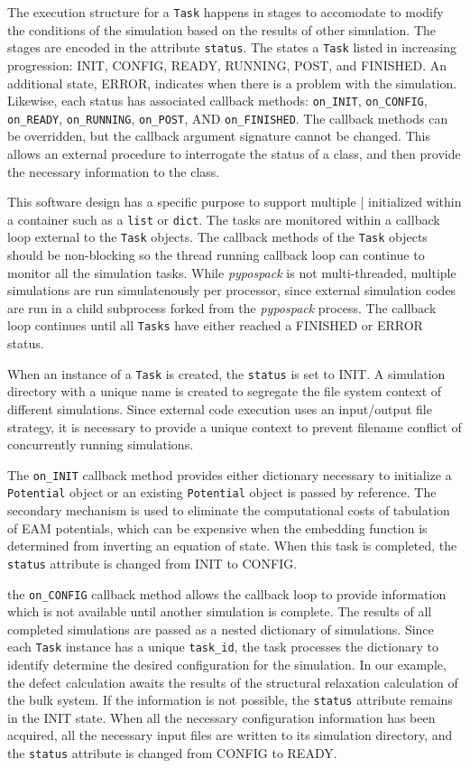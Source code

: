 The execution structure for a \verb|Task| happens in stages to accomodate to modify the conditions of the simulation based on the results of other simulation.  The stages are encoded in the attribute \verb|status|.  The states a \verb|Task| listed in increasing progression: INIT, CONFIG, READY, RUNNING, POST, and FINISHED.  An additional state, ERROR, indicates when there is a problem with the simulation.  Likewise, each status has associated callback methods: \verb|on_INIT|, \verb|on_CONFIG|, \verb|on_READY|, \verb|on_RUNNING|, \verb|on_POST|, AND \verb|on_FINISHED|.  The callback methods can be overridden, but the callback argument signature cannot be changed.  This allows an external procedure to interrogate the status of a class, and then provide the necessary information to the class.

This software design has a specific purpose to support multiple \Tasks| initialized within a container such as a \verb|list| or \verb|dict|.  The tasks are monitored within a callback loop external to the \verb|Task| objects.  The callback methods of the \verb|Task| objects should be non-blocking so the thread running callback loop can continue to monitor all the simulation tasks.  While \emph{pypospack} is not multi-threaded, multiple simulations are run simulatenously per processor, since external simulation codes are run in a child subprocess forked from the \emph{pypospack} process.  The callback loop continues until all \verb|Tasks| have either reached a FINISHED or ERROR status.

When an instance of a \verb|Task| is created, the \verb|status| is set to INIT.  A simulation directory with a unique name is created to segregate the file system context of different simulations.  Since external code execution uses an input/output file strategy, it is necessary to provide a unique context to prevent filename conflict of concurrently running simulations.

The \verb|on_INIT| callback method provides either dictionary necessary to initialize a \verb|Potential| object or an existing \verb|Potential| object is passed by reference.  The secondary mechanism is used to eliminate the computational costs of tabulation of EAM potentials, which can be expensive when the embedding function is determined from inverting an equation of state.  When this task is completed, the \verb|status| attribute is changed from INIT to CONFIG.

the \verb|on_CONFIG| callback method allows the callback loop to provide information which is not available until another simulation is complete.  The results of all completed simulations are passed as a nested dictionary of simulations.  Since each \verb|Task| instance has a unique \verb|task_id|, the task processes the dictionary to identify determine the desired configuration for the simulation.  In our example, the defect calculation awaits the results of the structural relaxation calculation of the bulk system.  If the information is not possible, the \verb|status| attribute remains in the INIT state.  When all the necessary configuration information has been acquired, all the necessary input files are written to its simulation directory, and the \verb|status| attribute is changed from CONFIG to READY.

